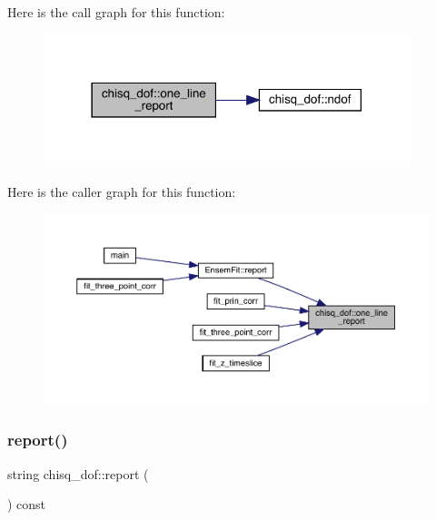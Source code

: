 Here is the call graph for this function\+:
\nopagebreak
\begin{figure}[H]
\begin{center}
\leavevmode
\includegraphics[width=302pt]{d0/dcc/structchisq__dof_af82b1ce8f285c664b9c9529df2dc527a_cgraph}
\end{center}
\end{figure}
Here is the caller graph for this function\+:
\nopagebreak
\begin{figure}[H]
\begin{center}
\leavevmode
\includegraphics[width=350pt]{d0/dcc/structchisq__dof_af82b1ce8f285c664b9c9529df2dc527a_icgraph}
\end{center}
\end{figure}
\mbox{\label{structchisq__dof_afa6ae05c4bc5fb54e635447c3358b09d}} 
\subsubsection{\texorpdfstring{report()}{report()}\hspace{0.1cm}{\footnotesize\ttfamily [1/2]}}
{\footnotesize\ttfamily string chisq\+\_\+dof\+::report (\begin{DoxyParamCaption}{ }\end{DoxyParamCaption}) const}


